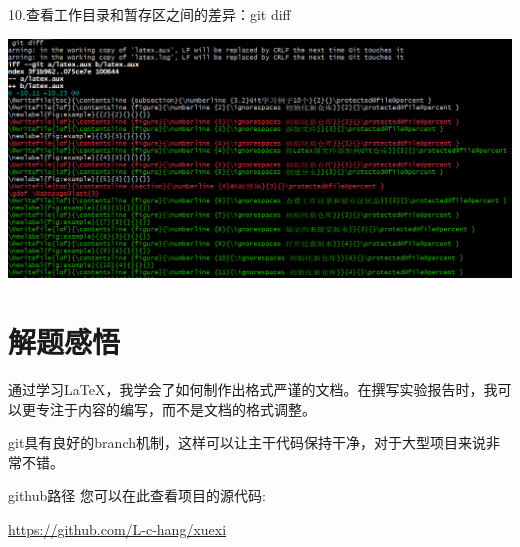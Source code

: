 \documentclass{article}
\begin{document}
	10.查看工作目录和暂存区之间的差异：git diff
	
	\noindent
	\begin{minipage}{\linewidth}
		\centering
		\includegraphics[width=0.5\linewidth]{diff.png}

	\end{minipage}
	
	
	
	
	\section{解题感悟}
	通过学习LaTeX，我学会了如何制作出格式严谨的文档。在撰写实验报告时，我可以更专注于内容的编写，而不是文档的格式调整。
	
	git具有良好的branch机制，这样可以让主干代码保持干净，对于大型项目来说非常不错。
	
	github路径
	您可以在此查看项目的源代码: 
	
	\url{https://github.com/L-c-hang/xuexi}
	
\end{document}
